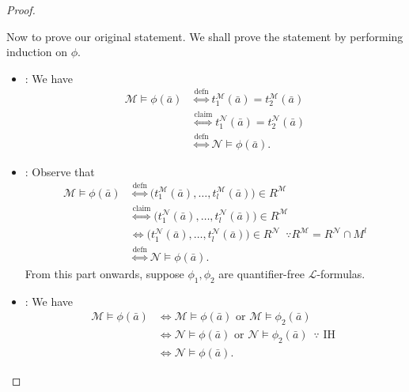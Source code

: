 \documentclass[notoc,notitlepage]{tufte-book}
\begin{document}
\begin{proof}
\begin{enumerate}
\begin{itemize}
          Now to prove our original statement. We shall prove the statement by performing induction on $\phi$.
          \begin{itemize}
            \item {}: We have
              \begin{align*}
                \mathcal{M} \models \phi(\bar{a}) &\overset{\text{defn}}{\iff} t_1^\mathcal{M} (\bar{a}) = t_2^\mathcal{M} (\bar{a}) \\
                                                  &\overset{\text{claim}}{\iff} t_1^\mathcal{N} (\bar{a}) = t_2^\mathcal{N} (\bar{a}) \\
                                                  &\overset{\text{defn}}{\iff} \mathcal{N} \models \phi(\bar{a}).
              \end{align*}

            \item {}: Observe that
              \begin{align*}
                \mathcal{M} \models \phi(\bar{a}) &\overset{\text{defn}}{\iff} \big( t_1^\mathcal{M} (\bar{a}), \ldots, t_l^\mathcal{M} (\bar{a}) \big) \in R^\mathcal{M} \\
                                                  &\overset{\text{claim}}{\iff} \big( t_1^\mathcal{N} (\bar{a}), \ldots, t_l^\mathcal{N} (\bar{a}) \big) \in R^\mathcal{M} \\
                                                  &\iff \big( t_1^\mathcal{N} (\bar{a}), \ldots, t_l^\mathcal{N} (\bar{a}) \big) \in R^\mathcal{N} \enspace \because R^\mathcal{M} = R^\mathcal{N} \cap M^l \\
                                                  &\overset{\text{defn}}{\iff} \mathcal{N} \models \phi(\bar{a}).
              \end{align*}
            From this part onwards, suppose $\phi_1, \phi_2$ are quantifier-free $\mathcal{L}$-formulas.

            \item {}: We have
              \begin{align*}
                \mathcal{M} \models \phi(\bar{a}) &\iff \mathcal{M} \models \phi(\bar{a}) \text{ or } \mathcal{M} \models \phi_2(\bar{a}) \\
                                                  &\iff \mathcal{N} \models \phi(\bar{a}) \text{ or } \mathcal{N} \models \phi_2(\bar{a}) \enspace \because \text{ IH } \\
                                                  &\iff \mathcal{N} \models \phi(\bar{a}).
              \end{align*}


\end{itemize}
\end{itemize}
\end{enumerate}
\end{proof}
\end{document}
